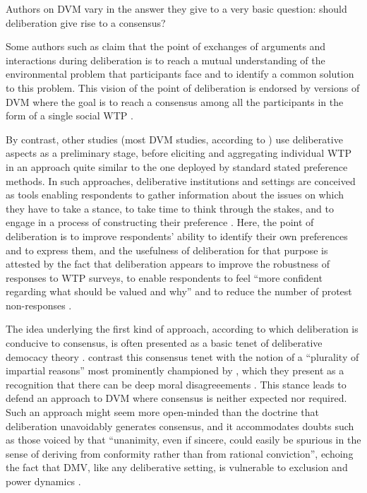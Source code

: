 \documentclass[version=last, pagesize, twoside=off, bibliography=totoc, DIV=calc, fontsize=14pt, a4paper, french, english]{scrartcl}
\begin{document}
Authors on DVM vary in the answer they give to a very basic question: should deliberation give rise to a consensus?

Some authors such as \citet{vatn_institutional_2009} claim that the point of exchanges of arguments and interactions during deliberation is to reach a mutual understanding of the environmental problem that participants face and to identify a common solution to this problem. This vision of the point of deliberation is endorsed by versions of DVM where the goal is to reach a consensus among all the participants in the form of a single social WTP \citep{orchard-webb_deliberative_2016}.

By contrast, other studies (most DVM studies, according to \citet{bunse_what_2015}) use deliberative aspects as a preliminary stage, before eliciting and aggregating individual WTP in an approach quite similar to the one deployed by standard stated preference methods. In such approaches, deliberative institutions and settings are conceived as tools enabling respondents to gather information about the issues on which they have to take a stance, to take time to think through the stakes, and to engage in a process of constructing their preference \citep{braga_preference_2005}. Here, the point of deliberation is to improve respondents' ability to identify their own preferences and to express them, and the usefulness of deliberation for that purpose is attested by the fact that deliberation appears to improve the robustness of responses to WTP surveys, to enable respondents to feel ``more confident regarding what should be valued and why'' \citep[p. 125, cited by \citet{bartkowski_beyond_2018}]{svedsater_economic_2003} and to reduce the number of protest non-responses \citep{szabo_reducing_2011}.

The idea underlying the first kind of approach, according to which deliberation is conducive to consensus, is often presented as a basic tenet of deliberative democacy theory \citep{wilson_discourse-based_2002}. \citet{bartkowski_beyond_2018} contrast this consensus tenet with the notion of a ``plurality of impartial reasons'' most prominently championed by \citet{sen_idea_2009}, which they present as a recognition that there can be deep moral disagreeements \citep{dryzek_deliberative_2013}. This stance leads \citet{bartkowski_beyond_2018} to defend an approach to DVM where consensus is neither expected nor required. Such an approach might seem more open-minded than the doctrine that deliberation unavoidably generates consensus, and it accommodates doubts such as those voiced by \citet{elster_sour_1983} that ``unanimity, even if sincere, could easily be spurious in the sense of deriving from conformity rather than from rational conviction'', echoing the fact that DMV, like any deliberative setting, is vulnerable to exclusion and power dynamics \citep{volker_exploring_2016,vargas_background_2016,vargas_problem_2017}.
\end{document}
